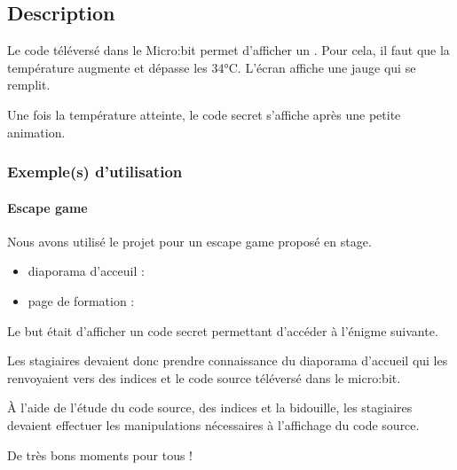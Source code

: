 \documentclass[letterpaper,10pt,french]{sphinxmanual}
\begin{document}
\subsection{Description}
\label{\detokenize{projets/temperature:description}}
\noindent{}

Le code téléversé dans le Micro:bit permet d’afficher un .
Pour cela, il faut que la température augmente et
dépasse les 34°C. L’écran affiche une jauge qui se remplit.

Une fois la température atteinte, le code secret s’affiche après
une petite animation.


\subsubsection{Exemple(s) d’utilisation}
\label{\detokenize{projets/temperature:exemple-s-d-utilisation}}

\paragraph{Escape game}
\label{\detokenize{projets/temperature-exemple-escape:projettempescape}}\label{\detokenize{projets/temperature-exemple-escape:escape-game}}\label{\detokenize{projets/temperature-exemple-escape::doc}}
Nous avons utilisé le projet  pour un escape game proposé en stage.
\begin{itemize}
\item {} 
diaporama d’acceuil : 

\item {} 
page de formation : 

\end{itemize}

Le but était d’afficher un code secret permettant d’accéder
à l’énigme suivante.

\noindent{}

Les stagiaires devaient donc prendre connaissance du diaporama
d’accueil qui les renvoyaient vers des indices et le code source
téléversé dans le micro:bit.

À l’aide de l’étude du code source, des indices et la bidouille,
les stagiaires devaient effectuer les manipulations nécessaires à
l’affichage du code source.

De très bons moments pour tous !
\end{document}
